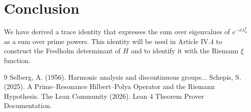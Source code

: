 \documentclass[11pt,a4paper]{article}
\begin{document}
\section{Conclusion}

We have derived a trace identity that expresses the sum over eigenvalues of $e^{-\sigma \lambda_n^2}$ as a sum over prime powers. This identity will be used in Article IV.4 to construct the Fredholm determinant of $H$ and to identify it with the Riemann $\xi$ function.


\begin{thebibliography}{9}
  Selberg, A. (1956). Harmonic analysis and discontinuous groups...
  Schepis, S. (2025). A Prime–Resonance Hilbert–Polya Operator and the Riemann Hypothesis.
  The Lean Community (2026). Lean 4 Theorem Prover Documentation.
\end{thebibliography}
\end{document}
